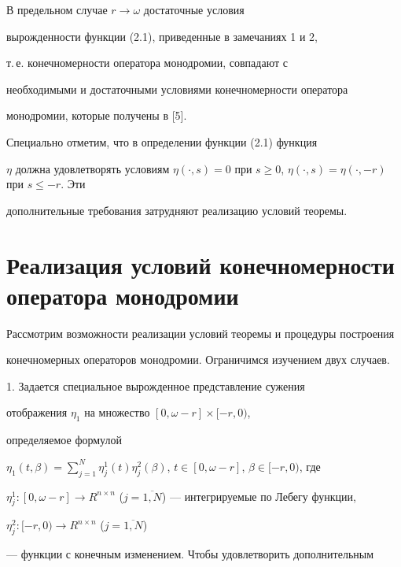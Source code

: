 В предельном случае $r \rightarrow \omega$ достаточные условия


вырожденности функции (2.1), приведенные в замечаниях 1  и 2,


т.\,е. конечномерности оператора монодромии, совпадают с


необходимыми и достаточными условиями конечномерности оператора


монодромии, которые получены в [5].





Специально отметим, что в определении функции (2.1) функция


$\eta$ должна удовлетворять условиям $\eta(\cdot,s) =0$ при $s


\geq0$, $ \eta(\cdot,s) = \eta(\cdot,-r)$ при $s \leq -r$. Эти


дополнительные требования затрудняют реализацию условий теоремы.








\section{Реализация условий конечномерности оператора монодромии}





Рассмотрим возможности реализации условий теоремы и процедуры построения


конечномерных операторов монодромии. Ограничимся изучением двух случаев.





1. Задается специальное вырожденное представление сужения


отображения $ \eta_{1}$ на множество $[0, \omega-r] \times [-r,0)$,


определяемое формулой


$\eta_{1}(t, \beta) = \sum\limits_{j=1}^{N} \eta_{j}^{1}


(t) \eta_{j}^{2}(\beta)$, $t \in [0, \omega-r]$, $\beta \in [-r,0)$, где


$ \eta_{j}^{1} : [0, \omega-r] \rightarrow


R^{n \times n}$ ($j= \overline{1,N}$) --- интегрируемые по Лебегу функции,


$ \eta_{j}^{2} : [-r,0) \rightarrow R^{n \times n}$ ($j= \overline{1,N}$)


--- функции с конечным изменением. Чтобы удовлетворить дополнительным


